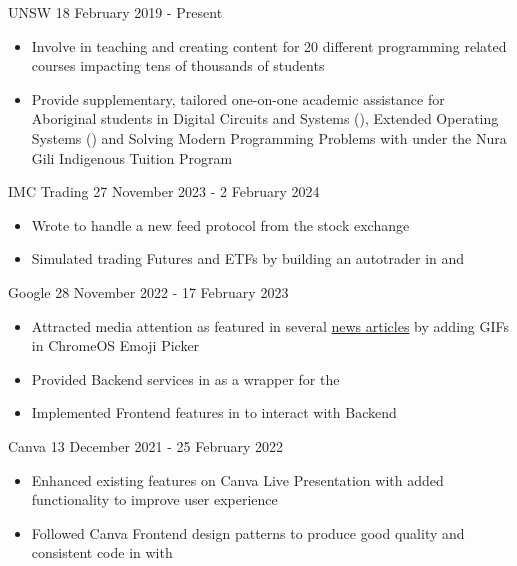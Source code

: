 \documentclass[paper=a4,fontsize=9pt]{resume}
\begin{document}
{	\divider

		{UNSW}
		{18 February 2019 - Present}
	\begin{itemize}
		\item Involve in teaching and creating content for 20 different programming related courses impacting tens of thousands of students
		\item Provide supplementary, tailored one-on-one academic assistance for Aboriginal students in Digital Circuits and Systems (), Extended Operating Systems () and Solving Modern Programming Problems with  under the Nura Gili Indigenous Tuition Program
	\end{itemize}

	\divider

		{IMC Trading}
		{27 November 2023 - 2 February 2024}
	\begin{itemize}
		\item Wrote  to handle a new feed protocol from the stock exchange
		\item Simulated trading Futures and ETFs by building an autotrader in  and 
	\end{itemize}

	\divider

		{Google}
		{28 November 2022 - 17 February 2023}
	\begin{itemize}
		\item Attracted media attention as featured in several \href{https://chromeunboxed.com/gif-support-chromebook-chrome-os-emoji-picker/}{news articles} by adding GIFs in ChromeOS Emoji Picker
		\item Provided Backend services in  as a wrapper for the 
		\item Implemented Frontend features in  to interact with Backend
	\end{itemize}

	\divider

		{Canva}
		{13 December 2021 - 25 February 2022}
	\begin{itemize}
		\item Enhanced existing features on Canva Live Presentation with added functionality to improve user experience
		\item Followed Canva Frontend design patterns to produce good quality and consistent code in  with 
	\end{itemize}

}
\end{document}

